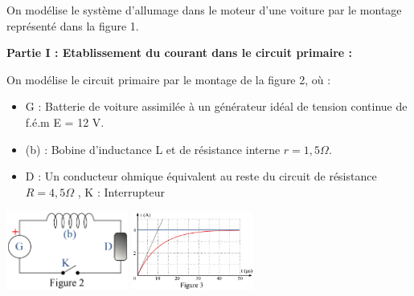 \documentclass[12pt]{article}
\begin{document}
On modélise le système d’allumage dans le moteur d’une voiture par le montage
représenté dans la figure 1.

\hspace{-1cm}\textbf{Partie I : Etablissement du courant dans le circuit primaire :  \dotfill}

On modélise le circuit primaire par le montage de la figure 2, où :

\begin{itemize}
	\item G : Batterie de voiture assimilée à un générateur
idéal de tension continue de f.é.m E = 12 V.
\item (b) : Bobine d’inductance L et de résistance
interne $r = 1,5 \Omega$.
\item D : Un conducteur ohmique équivalent au reste
du circuit de résistance $R = 4,5 \Omega$ , K : Interrupteur

\end{itemize}


\begin{center}
	\includegraphics[width=0.3\textwidth]{./img/RL01.png}
	\includegraphics[width=0.3\textwidth]{./img/RL02.png}
	  \vspace{-0.5cm}
  \end{center}
\end{document}
